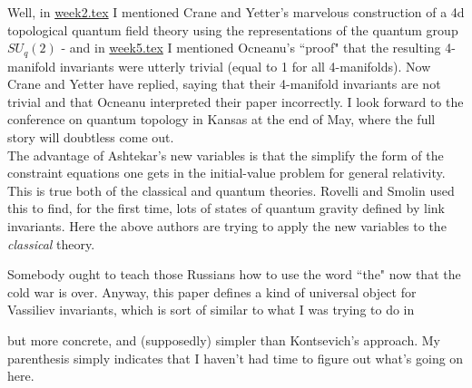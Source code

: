 Well, in {\hyperref[week2]{week2.tex}} I mentioned Crane and Yetter's marvelous construction of a 4d topological quantum field theory using the representations of the quantum group $SU_q(2)$ - and in {\hyperref[week5]{week5.tex}} I mentioned Ocneanu's ``proof" that the resulting 4-manifold invariants were utterly trivial (equal to 1 for all 4-manifolds). Now Crane and Yetter have replied, saying that their 4-manifold invariants are not trivial and that Ocneanu interpreted their paper incorrectly. I look forward to the conference on quantum topology in Kansas at the end of May, where the full story will doubtless come out.
\\
The advantage of Ashtekar's new variables is that the simplify the form of the constraint equations one gets in the initial-value problem for general relativity. This is true both of the classical and quantum theories. Rovelli and Smolin used this to find, for the first time, lots of states of quantum gravity defined by link invariants. Here the above authors are trying to apply the new variables to the \textit{classical} theory.

Somebody ought to teach those Russians how to use the word ``the" now that the cold war is over. Anyway, this paper defines a kind of universal object for Vassiliev invariants, which is sort of similar to what I was trying to do in


but more concrete, and (supposedly) simpler than Kontsevich's approach. My parenthesis simply indicates that I haven't had time to figure out what's going on here.


